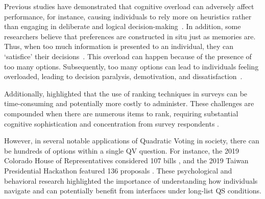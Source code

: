 Previous studies have demonstrated that cognitive overload can adversely affect performance, for instance, causing individuals to rely more on heuristics rather than engaging in deliberate and logical decision-making~\cite{daniel2017thinking}. In addition, some researchers believe that preferences are constructed in situ just as memories are. Thus, when too much information is presented to an individual, they can `satisfice' their decisions~\cite{simonBehavioralModelRational1955, payneAdaptiveStrategySelection1988, tverskyJudgmentsRepresentativeness}. This overload can happen because of the presence of too many options. Subsequently, too many options can lead to individuals feeling overloaded, leading to decision paralysis, demotivation, and dissatisfaction~\cite{iyengarWhenChoiceDemotivating2000}. 

Additionally, \textcite{alwinMeasurementValuesSurveys1985} highlighted that the use of ranking techniques in surveys can be time-consuming and potentially more costly to administer. These challenges are compounded when there are numerous items to rank, requiring substantial cognitive sophistication and concentration from survey respondents \cite{featherMeasurementValuesEffects1973}.

However, in several notable applications of Quadratic Voting in society, there can be hundreds of options within a single QV question. For instance, the 2019 Colorado House of Representatives considered 107 bills \cite{NewWayVoting}, and the 2019 Taiwan Presidential Hackathon featured 136 proposals \cite{QuadraticVotingFrontend2022}. These psychological and behavioral research highlighted the importance of understanding how individuals navigate and can potentially benefit from interfaces under long-list QS conditions.



